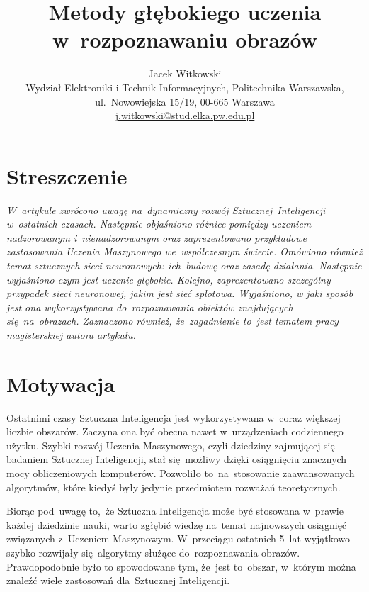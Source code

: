 \documentclass[oneside, 11pt, a4paper]{article}
\title{\fontsize{14pt}{10pt}\selectfont\textbf{Metody głębokiego uczenia w~rozpoznawaniu obrazów}} %
\author{
{\fontsize{12pt}{1.2em}\selectfont Jacek Witkowski} \\
{\fontsize{11pt}{1.2em}\selectfont Wydział Elektroniki i Technik Informacyjnych, Politechnika Warszawska,}\\
{\fontsize{11pt}{1.2em}\selectfont ul.~Nowowiejska 15/19, 00-665 Warszawa}\\
{\fontsize{11pt}{1.2em}\selectfont \href{mailto:j.witkowski@stud.elka.pw.edu.pl}{j.witkowski@stud.elka.pw.edu.pl}} 
\date{}
}
\begin{document}
\maketitle %


\begin{multicols}{2} %

\section*{Streszczenie}

\textit{
W~artykule zwrócono uwagę na~dynamiczny rozwój Sztucznej~Inteligencji w~ostatnich czasach. Następnie objaśniono różnice pomiędzy uczeniem nadzorowanym i~nienadzorowanym oraz zaprezentowano przykładowe zastosowania Uczenia Maszynowego we~współczesnym świecie. Omówiono również temat sztucznych sieci neuronowych: ich~budowę oraz zasadę działania. Następnie wyjaśniono czym jest uczenie głębokie. Kolejno, zaprezentowano szczególny przypadek sieci neuronowej, jakim jest sieć splotowa. Wyjaśniono, w jaki sposób jest ona wykorzystywana do~rozpoznawania obiektów znajdujących się~na~obrazach. Zaznaczono również, że~zagadnienie to~jest tematem pracy magisterskiej autora artykułu.
}

\section{Motywacja}
Ostatnimi czasy Sztuczna Inteligencja jest wykorzystywana w~coraz większej liczbie obszarów. Zaczyna ona być obecna nawet w~urządzeniach codziennego użytku. Szybki rozwój Uczenia Maszynowego, czyli dziedziny zajmującej się badaniem Sztucznej Inteligencji, stał się~możliwy dzięki osiągnięciu znacznych mocy obliczeniowych komputerów. Pozwoliło to~na~stosowanie zaawansowanych algorytmów, które kiedyś były jedynie przedmiotem rozważań teoretycznych.

Biorąc pod~uwagę to,~że Sztuczna Inteligencja może być stosowana w~prawie każdej dziedzinie nauki, warto zgłębić wiedzę na~temat najnowszych osiągnięć związanych z~Uczeniem Maszynowym. W~przeciągu ostatnich 5~lat wyjątkowo szybko rozwijały się~algorytmy służące do~rozpoznawania obrazów. Prawdopodobnie było to spowodowane tym, że~jest to~obszar, w~którym można znaleźć wiele zastosowań dla~Sztucznej Inteligencji.


\end{multicols}
\end{document}

